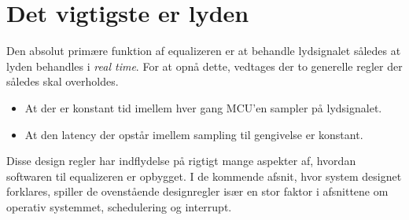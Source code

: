 \section{Det vigtigste er lyden}
Den absolut primære funktion af equalizeren er at behandle lydsignalet således at lyden behandles i \textit{real time}.
For at opnå dette, vedtages der to generelle regler der således skal overholdes.
\begin{itemize}[noitemsep]
\item At der er konstant tid imellem hver gang MCU'en sampler på lydsignalet.
\item At den latency der opstår imellem sampling til gengivelse er konstant.
\end{itemize}

Disse design regler har indflydelse på rigtigt mange aspekter af, hvordan softwaren til equalizeren er opbygget.
I de kommende afsnit, hvor system designet forklares, spiller de ovenstående designregler især en stor faktor i afsnittene om operativ systemmet, schedulering og interrupt.



